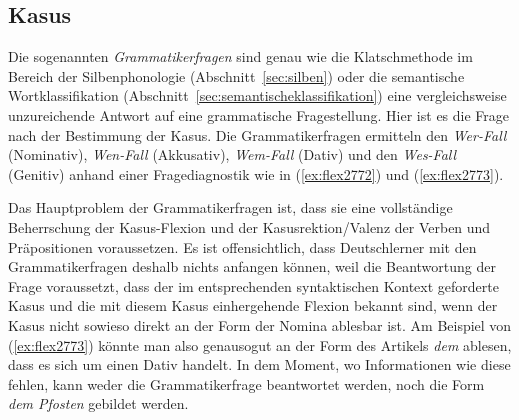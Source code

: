 \subsection{Kasus}

\label{sec:kasus}


Die sogenannten \textit{Grammatikerfragen} sind genau wie die Klatschmethode im Bereich der Silbenphonologie (Abschnitt~\ref{sec:silben}) oder die semantische Wortklassifikation (Abschnitt~\ref{sec:semantischeklassifikation}) eine vergleichsweise unzureichende Antwort auf eine grammatische Fragestellung.
Hier ist es die Frage nach der Bestimmung der Kasus.
Die Grammatikerfragen ermitteln den \textit{Wer-Fall} (Nominativ), \textit{Wen-Fall} (Akkusativ), \textit{Wem-Fall} (Dativ) und den \textit{Wes-Fall} (Genitiv) anhand einer Fragediagnostik wie in (\ref{ex:flex2772}) und (\ref{ex:flex2773}).

\begin{exe}
  \ex \label{ex:flex2772}
  \begin{xlist}
  \end{xlist}
  \ex \label{ex:flex2773}
  \begin{xlist}
  \end{xlist}
\end{exe}

Das Hauptproblem der Grammatikerfragen ist, dass sie eine vollständige Beherrschung der Kasus-Flexion und der Kasusrektion\slash Valenz der Verben und Präpositionen voraussetzen.
Es ist offensichtlich, dass \zB Deutschlerner mit den Grammatikerfragen deshalb nichts anfangen können, weil die Beantwortung der Frage voraussetzt, dass der im entsprechenden syntaktischen Kontext geforderte Kasus und die mit diesem Kasus einhergehende Flexion bekannt sind, wenn der Kasus nicht sowieso direkt an der Form der Nomina ablesbar ist.
Am Beispiel von (\ref{ex:flex2773}) könnte man also genausogut an der Form des Artikels \textit{dem} ablesen, dass es sich um einen Dativ handelt.
In dem Moment, wo Informationen wie diese fehlen, kann weder die Grammatikerfrage beantwortet werden, noch die Form \textit{dem Pfosten} gebildet werden.

